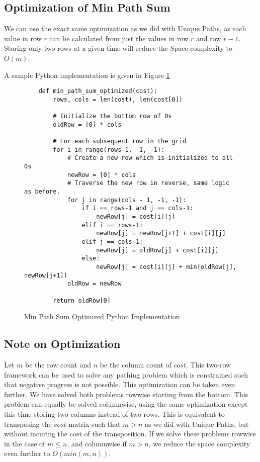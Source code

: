 \subsection*{Optimization of Min Path Sum}
We can use the exact same optimization as we did with Unique Paths, as each value in row $r$ can be calculated from just the values in row $r$ and row $r-1$.
Storing only two rows at a given time will reduce the Space complexity to $O(m)$.

A sample Python implementation is given in Figure \ref{fig:min-path-sum-optimized}
\begin{figure}[H]
    \centering
    \begin{lstlisting}
    def min_path_sum_optimized(cost):
        rows, cols = len(cost), len(cost[0])
        
        # Initialize the bottom row of 0s
        oldRow = [0] * cols
    
        # For each subsequent row in the grid
        for i in range(rows-1, -1, -1):
            # Create a new row which is initialized to all 0s
            newRow = [0] * cols
            # Traverse the new row in reverse, same logic as before.
            for j in range(cols - 1, -1, -1):
                if i == rows-1 and j == cols-1:
                    newRow[j] = cost[i][j]
                elif i == rows-1:
                    newRow[j] = newRow[j+1] + cost[i][j]
                elif j == cols-1:
                    newRow[j] = oldRow[j] + cost[i][j]
                else:
                    newRow[j] = cost[i][j] + min(oldRow[j], newRow[j+1])
            oldRow = newRow
    
        return oldRow[0]
    \end{lstlisting}
    \caption{Min Path Sum Optimized Python Implementation}
    \label{fig:min-path-sum-optimized}
\end{figure}
\subsection*{Note on Optimization}
Let $m$ be the row count and $n$ be the column count of $cost$.
This two-row framework can be used to solve any pathing problem which is constrained such that negative progress is not possible.
This optimization can be taken even further. We have solved both problems rowwise starting from the bottom. This problem can equally be solved columnwise,
using the same optimization except this time storing two columns instead of two rows.
This is equivalent to transposing the $cost$ matrix such that $m > n$ as we did with Unique Paths, but without incuring the cost of the transposition.
If we solve these problems rowwise in the case of $m \leq n$, and columnwise if $m > n$, we reduce the space complexity even further to $O(min(m,n))$.